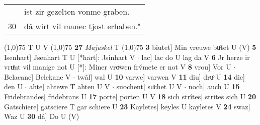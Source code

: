 \documentclass[8pt,a4paper,notitlepage]{article}
\begin{document}
\begin{table}[ht]
\begin{minipage}[t]{0.5\linewidth}
\begin{tabular}{rl}
 & ist zir gezelten vonme graben.\\ 
30 & dâ wirt vil manec tjost erhaben."\\ 
\end{tabular}
\scriptsize
\line(1,0){75} \newline
T U V \newline
\line(1,0){75} \newline
\textbf{27} \textit{Majuskel} T  \newline
\line(1,0){75} \newline
\textbf{3} biutet] Min vreuwe buͦtet U (V) \textbf{5} Isenhart] Jsenhart T U [*hart]: Jsinhart V  $\cdot$ lac] lac do U lag da V \textbf{6} Jr herze ir vruͦnt vil manige not U [*]: Miner vroͮwen frv́mete er not V \textbf{8} vrou] Vor U  $\cdot$ Belacane] Belekane V  $\cdot$ twâl] wal U \textbf{10} varwe] varwen V \textbf{11} diu] druͦ U \textbf{14} die] den U  $\cdot$ ahte] ahtewe T ahten U V  $\cdot$ suochent] suͦchet U V  $\cdot$ noch] auch U \textbf{15} Fridebrandes] fridebrans U \textbf{17} porte] porten U V \textbf{18} sich strîtes] strites sich U \textbf{20} Gatschiere] gatsciere T gar schiere U \textbf{23} Kayletes] keyles U kaẏletes V \textbf{24} swaz] Waz U \textbf{30} dâ] Do U (V) \newline
\end{minipage}
\end{table}
\end{document}
